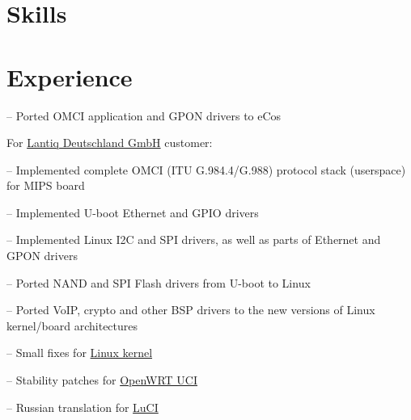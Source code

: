 \documentclass{cv}
\begin{document}
\section{Skills}
\begin{sklist}
\end{sklist}
\section{Experience}
\begin{joblist}
{
  \par -- Ported OMCI application and GPON drivers to eCos
}
{
  For \href{http://www.lantiq.com}{Lantiq Deutschland GmbH} customer:
  \par -- Implemented complete OMCI (ITU G.984.4/G.988) protocol stack (userspace) for MIPS board
  \par -- Implemented U-boot Ethernet and GPIO drivers
  \par -- Implemented Linux I2C and SPI drivers, as well as parts of Ethernet and GPON drivers
  \par -- Ported NAND and SPI Flash drivers from U-boot to Linux
  \par -- Ported VoIP, crypto and other BSP drivers to the new versions of Linux kernel/board architectures
  }
{
  \par -- Small fixes for \href{http://git.kernel.org/?p=linux\%2Fkernel\%2Fgit\%2Ftorvalds\%2Flinux.git\&a=search\&h=HEAD\&st=commit\&s=Stanislav+Fomichev}{Linux kernel}
  \par -- Stability patches for \href{http://nbd.name/gitweb.cgi?p=uci.git\&a=search\&h=HEAD\&st=commit\&s=Stanislav+Fomichev}{OpenWRT UCI}
  \par -- Russian translation for \href{http://i18n.luci.subsignal.org/pootle/ru/}{LuCI}
}
\end{joblist}
\end{document}
